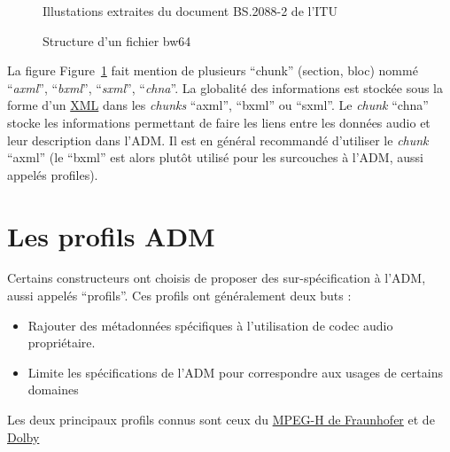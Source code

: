\documentclass[
  letterpaper,
  DIV=11,
  numbers=noendperiod]{scrreprt}
\providecommand{\tightlist}{%
  \setlength{\itemsep}{0pt}\setlength{\parskip}{0pt}}\usepackage{longtable,booktabs,array}
\begin{document}
\begin{figure}
\begin{minipage}[b]{0.65\linewidth}
{{}

\caption{\label{fig-bw64}Structure d'un fichier bw64}

}

\end{minipage}%
\newline
\begin{minipage}[b]{\linewidth}

{\centering 

Illustations extraites du document BS.2088-2 de l'ITU

}

\end{minipage}%

\end{figure}

La figure Figure~\ref{fig-bw64} fait mention de plusieurs ``chunk''
(section, bloc) nommé ``\emph{axml}'', ``\emph{bxml}'', ``\emph{sxml}'',
``\emph{chna}''. La globalité des informations est stockée sous la forme
d'un
\href{https://fr.wikipedia.org/wiki/Extensible_Markup_Language}{XML}
dans les \emph{chunks} ``axml'', ``bxml'' ou ``sxml''. Le \emph{chunk}
``chna'' stocke les informations permettant de faire les liens entre les
données audio et leur description dans l'ADM. Il est en général
recommandé d'utiliser le \emph{chunk} ``axml'' (le ``bxml'' est alors
plutôt utilisé pour les surcouches à l'ADM, aussi appelés profiles).

\hypertarget{les-profils-adm}{%
\section{Les profils ADM}\label{les-profils-adm}}

Certains constructeurs ont choisis de proposer des sur-spécification à
l'ADM, aussi appelés ``profils''. Ces profils ont généralement deux buts
:

\begin{itemize}
\tightlist
\item
  Rajouter des métadonnées spécifiques à l'utilisation de codec audio
  propriétaire.
\item
  Limite les spécifications de l'ADM pour correspondre aux usages de
  certains domaines
\end{itemize}

Les deux principaux profils connus sont ceux du
\href{https://www.iis.fraunhofer.de/en/ff/amm/dl/whitepapers/adm-profile.html}{MPEG-H
de Fraunhofer} et de
\href{https://professionalsupport.dolby.com/s/article/Dolby-Atmos-ADM-Profile-specification?language=en_US}{Dolby}
\end{document}
